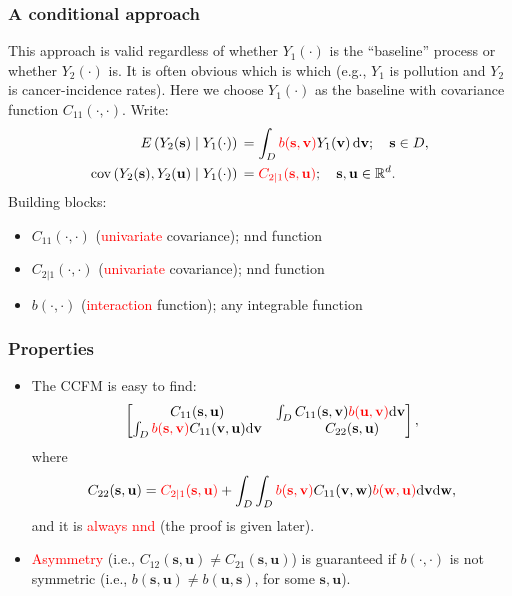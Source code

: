 \documentclass{beamer}
\newcommand{\svec} {\textbf{s}}
\newcommand{\uvec} {\textbf{u}}
\newcommand{\s}{\mathbf{s}}
\renewcommand{\v}{\mathbf{v}}
\renewcommand{\u}{\mathbf{u}}
\newcommand{\w}{\mathbf{w}}
\renewcommand{\d}{\mathrm{d}}
\newcommand{\E}{E}
\newcommand{\cov}{\mathrm{cov}}
\newcommand{\red}{\textcolor{red}}%
\begin{document}


\begin{frame}
\frametitle{A conditional approach}
This approach is valid regardless of whether $Y_1(\cdot)$ is the ``baseline'' process or whether $Y_2(\cdot)$ is. It is often obvious which is which (e.g., $Y_1$ is pollution and $Y_2$ is cancer-incidence rates). Here we choose $Y_1(\cdot)$ as the baseline with covariance function $C_{11}(\cdot,\cdot)$. Write:
\begin{align*}
\E\left(Y_2(\s)\mid Y_1(\cdot)\right)&\,=\int_D{\textcolor{red}{b(\s,\v)}Y_1(\v)\,\d \v};\quad \s\in D,\\
\cov\left(Y_2(\s),Y_2(\u)\mid Y_1(\cdot)\right)&\,=\textcolor{red}{C_{2\mid 1}(\s,\u)};\quad \s,\u\in \mathbb{R}^d.
\end{align*}
Building blocks:
\begin{itemize}
\item $C_{11}(\cdot,\cdot)$ (\textcolor{red}{univariate} covariance); nnd function
\item $C_{2|1}(\cdot,\cdot)$ (\textcolor{red}{univariate} covariance); nnd function
\item $b(\cdot,\cdot)$ (\textcolor{red}{interaction} function); any integrable function
\end{itemize}
\end{frame}


\begin{frame}
\frametitle{Properties}
\begin{itemize}
\item The CCFM is easy to find:
$$
\begin{bmatrix} C_{11}(\s,\u) & \int_DC_{11}(\s,\v)\textcolor{red}{b(\u,\v)}\d\v \\ \int_D\textcolor{red}{b(\s,\v)}C_{11}(\v,\u)\d\v & ~~~~~C_{22}(\s,\u)\end{bmatrix},
$$
where 
$$
C_{22}(\s,\u) = \textcolor{red}{C_{2\mid 1}(\s,\u)}+\int_D\int_D \red{b(\s,\v)}C_{11}(\v,\w) \red{b(\w,\u)}\d\v\d\w,
$$
and it is \textcolor{red}{always nnd} (the proof is given later). \vfill

\item \textcolor{red}{Asymmetry} (i.e., $C_{12}(\svec,\uvec) \ne C_{21}(\svec,\uvec)$) is guaranteed if $b(\cdot,\cdot)$ is not symmetric (i.e., $b(\s,\u)\neq b(\u,\s)$, for some $\s,\u$).\vfill
\end{itemize}
\end{frame}
\end{document}
